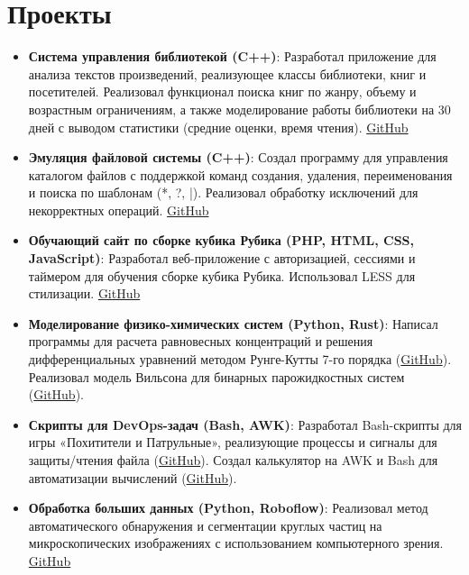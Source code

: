 \documentclass[a4paper,11pt]{article}
\begin{document}
	\section{Проекты}
	\begin{itemize}[leftmargin=*]
		\item \textbf{Система управления библиотекой (C++)}: Разработал приложение для анализа текстов произведений, реализующее классы библиотеки, книг и посетителей. Реализовал функционал поиска книг по жанру, объему и возрастным ограничениям, а также моделирование работы библиотеки на 30 дней с выводом статистики (средние оценки, время чтения). \href{https://github.com/CorgiPuppy/cpp-labs/tree/master/lab8}{GitHub}
		\item \textbf{Эмуляция файловой системы (C++)}: Создал программу для управления каталогом файлов с поддержкой команд создания, удаления, переименования и поиска по шаблонам (*, ?, |). Реализовал обработку исключений для некорректных операций. \href{https://github.com/CorgiPuppy/cpp-labs/tree/master/lab10}{GitHub}
		\item \textbf{Обучающий сайт по сборке кубика Рубика (PHP, HTML, CSS, JavaScript)}: Разработал веб-приложение с авторизацией, сессиями и таймером для обучения сборке кубика Рубика. Использовал LESS для стилизации. \href{https://github.com/CorgiPuppy/web-labs/tree/master/myOwnSite}{GitHub}
		\item \textbf{Моделирование физико-химических систем (Python, Rust)}: Написал программы для расчета равновесных концентраций и решения дифференциальных уравнений методом Рунге-Кутты 7-го порядка (\href{https://github.com/CorgiPuppy/phys-chem-labs/tree/master/lab7}{GitHub}). Реализовал модель Вильсона для бинарных парожидкостных систем (\href{https://github.com/CorgiPuppy/phys-chem-labs/tree/master/lab3}{GitHub}).
		\item \textbf{Скрипты для DevOps-задач (Bash, AWK)}: Разработал Bash-скрипты для игры «Похитители и Патрульные», реализующие процессы и сигналы для защиты/чтения файла (\href{https://github.com/CorgiPuppy/info-sys-admin-labs/tree/master/lab8}{GitHub}). Создал калькулятор на AWK и Bash для автоматизации вычислений (\href{https://github.com/CorgiPuppy/info-sys-admin-labs/tree/master/lab7/src/task3}{GitHub}).
		\item \textbf{Обработка больших данных (Python, Roboflow)}: Реализовал метод автоматического обнаружения и сегментации круглых частиц на микроскопических изображениях с использованием компьютерного зрения. \href{https://github.com/CorgiPuppy/big-data-labs/tree/master/labParticles}{GitHub}
	\end{itemize}
\end{document}
